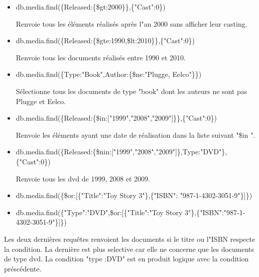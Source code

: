 \begin{itemize}
    \item \begin{tt} db.media.find(\{Released:\{\$gt:2000\}\},\{"Cast":0\}) \end{tt} \newline
    Renvoie tous les éléments réalisés après l"an 2000 sans afficher leur casting.
    \item \begin{tt} db.media.find(\{Released:\{\$gte:1990,\$lt:2010\}\},\{"Cast":0\}) \end{tt} \newline
    Renvoie tous les documents réalisés entre 1990 et 2010.
    \item \begin{tt} db.media.find(\{Type:"Book",Author:\{\$ne:"Plugge, Eelco"\}\}) \end{tt} \newline
    Sélectionne tous les documents de type "book" dont les auteurs ne sont pas Plugge et Eelco.
    \item \begin{tt} db.media.find(\{Released:\{\$in:["1999","2008","2009"]\}\},\{"Cast":0\}) \end{tt} \newline
    Renvoie les éléments ayant une date de réalisation dans la liste suivant "\$in ".
    \item \begin{tt} db.media.find(\{Released:\{\$nin:["1999","2008","2009"]\},Type:"DVD"\},\{"Cast":0\}) \end{tt}
    Renvoie tous les dvd de 1999, 2008 et 2009.
    \item \begin{tt} db.media.find(\{\$or:[\{"Title":"Toy Story 3"\},\{"ISBN":
"987-1-4302-3051-9"\}]\}) \end{tt}
    \item \begin{tt} db.media.find(\{"Type":"DVD",\$or:[\{"Title":"Toy Story 3"\},\{"ISBN":"987-1-4302-3051-9"\}]\})
\end{tt} \newline
    \end{itemize}
    \par
    Les deux dernières requêtes renvoient les documents si le titre ou l"ISBN respecte la condition. La dernière est plus selective car elle ne concerne que les documents de type dvd. La condition "type :DVD" est en produit logique avec la condition préscédente.
